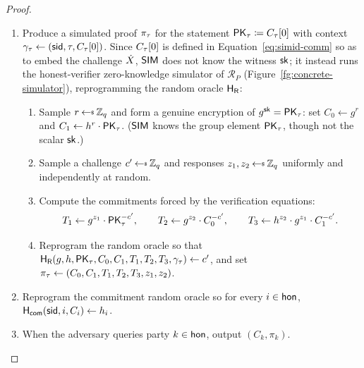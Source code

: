 \begin{proof}
\begin{itemize}
\begin{enumerate}
{        arbitrary honest indices carrying freshly sampled shares.}
        This makes $C_\simid[\ell] = g^{a_\ell}$ a commitment to the $\ell$-th \emph{coefficient} $a_\ell$ of $f_\simid$,
        as required by the protocol's commitment vectors and the Round~4 check $g^{f_i(k)} = \prod_{\ell} C_i[\ell]^{k^\ell}$.
        \item Produce a simulated proof $\pi_\tau$ for the statement $\mathsf{PK}_\tau \coloneqq C_\tau[0]$
          with context $\gamma_\tau \gets (\mathsf{sid}, \tau, C_\tau[0])$.
          Since $C_\tau[0]$ is defined in Equation~\eqref{eq:simid-comm} so as to embed the challenge
          $\dot{X}$, $\mathsf{SIM}$ does not know the witness $\mathsf{sk}$; it instead runs the honest-verifier
          zero-knowledge simulator of $\mathcal{R}_P$ (Figure~\ref{fg:concrete-simulator}),
          reprogramming the random oracle $\mathsf{H_{\mathsf{R}}}$:
          \begin{enumerate}
            \item Sample $r \rgets \Zq$ and form a genuine encryption of $g^{\mathsf{sk}} = \mathsf{PK}_\tau$:
              set $C_0 \gets g^{r}$ and $C_1 \gets h^{r}\cdot \mathsf{PK}_\tau$. ($\mathsf{SIM}$ knows the group
              element $\mathsf{PK}_\tau$, though not the scalar $\mathsf{sk}$.)
            \item Sample a challenge $c' \rgets \Zq$ and responses $z_1, z_2 \rgets \Zq$ uniformly and
              independently at random.
            \item Compute the commitments forced by the verification equations:
              \[
                T_1 \gets g^{z_1}\cdot \mathsf{PK}_\tau^{-c'}, \qquad
                T_2 \gets g^{z_2}\cdot C_0^{-c'}, \qquad
                T_3 \gets h^{z_2}\cdot g^{z_1}\cdot C_1^{-c'}.
              \]
            \item Reprogram the random oracle so that
              $\mathsf{H_{\mathsf{R}}}(g, h, \mathsf{PK}_\tau, C_0, C_1, T_1, T_2, T_3, \gamma_\tau) \gets c'$,
              and set $\pi_\tau \gets (C_0, C_1, T_1, T_2, T_3, z_1, z_2)$.
          \end{enumerate}
        \item Reprogram the commitment random oracle so for every $i \in \mathsf{hon}$,
          $\mathsf{H_{\mathsf{com}}}(\mathsf{sid}, i, C_i) \gets h_i$.
        \item When the adversary queries party $k \in \mathsf{hon}$, output $(C_k, \pi_k)$.
      \end{enumerate}
    \end{itemize}

    \medskip


\end{proof}
